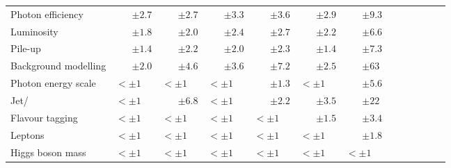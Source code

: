 \begin{table}[!htp]
\begin{center}
{\begin{tabular}{lllllllllllll}
\hspace{3mm}Photon efficiency				                            & ~~~\,$\pm 2.7$	& ~~~\,$\pm 2.7$	& ~~~\,$\pm 3.3$	& ~~~\,$\pm 3.6$	& ~~~\,$\pm 2.9$	& ~~~\,$\pm 9.3$	\\
\hspace{3mm}Luminosity				                                    & ~~~\,$\pm 1.8$	& ~~~\,$\pm 2.0$	& ~~~\,$\pm 2.4$	& ~~~\,$\pm 2.7$	& ~~~\,$\pm 2.2$	& ~~~\,$\pm 6.6$ \\
\hspace{3mm}Pile-up				                                        & ~~~\,$\pm 1.4$	& ~~~\,$\pm 2.2$	& ~~~\,$\pm 2.0$	& ~~~\,$\pm 2.3$	& ~~~\,$\pm 1.4$	& ~~~\,$\pm 7.3$	\\
\hspace{3mm}Background modelling				                            & ~~~\,$\pm 2.0$	& ~~~\,$\pm 4.6$	& ~~~\,$\pm 3.6$	& ~~~\,$\pm 7.2$	& ~~~\,$\pm 2.5$	& ~~~\,$\pm 63$	\\
\hspace{3mm}Photon energy scale				                    &$< \pm 1$	&$< \pm 1$	&$< \pm 1$	& ~~~\,$\pm 1.3$	&$< \pm 1$	& ~~~\,$\pm 5.6$	\\
\hspace{3mm}Jet/\met				                                    &$< \pm 1$	& ~~~\,$\pm 6.8$	&$< \pm 1$	& ~~~\,$\pm 2.2$	& ~~~\,$\pm 3.5$	& ~~~\,$\pm 22$ \\
 
\hspace{3mm}Flavour tagging				                                &$< \pm 1$	&$< \pm 1$	&$< \pm 1$	&$< \pm 1$	& ~~~\,$\pm 1.5$	& ~~~\,$\pm 3.4$	\\
\hspace{3mm}Leptons				                                        &$< \pm 1$	&$< \pm 1$	&$< \pm 1$	&$< \pm 1$	&$< \pm 1$	& ~~~\,$\pm 1.8$	\\
\hspace{3mm}Higgs boson mass				                            &$< \pm 1$	&$< \pm 1$	&$< \pm 1$	&$< \pm 1$	&$< \pm 1$	&$< \pm 1$	\\
 
 
 
\hline
\hline
\end{tabular}
}
\end{center}
\end{table}
